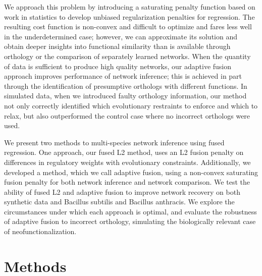 \documentclass[11pt]{article}
\begin{document}
We approach this problem by introducing a saturating penalty function based on work in statistics to develop unbiased regularization penalties for regression. The resulting cost function is non-convex and difficult to optimize and fares less well in the underdetermined case; however, we can approximate its solution and obtain deeper insights into functional similarity than is available through orthology or the comparison of separately learned networks. When the quantity of data is sufficient to produce high quality networks, our adaptive fusion approach improves performance of network inference; this is achieved in part through the identification of presumptive orthologs with different functions. In simulated data, when we introduced faulty orthology information, our method not only correctly identified which evolutionary restraints to enforce and which to relax, but also outperformed the control case where no incorrect orthologs were used. 

We present two methods to multi-species network inference using fused regression. One approach, our fused L2 method, uses an L2 fusion penalty on differences in regulatory weights with evolutionary constraints. Additionally, we developed a method, which we call adaptive fusion, using a non-convex saturating fusion penalty for both network inference and network comparison. We test the ability of fused L2 and adaptive fusion to improve network recovery on both synthetic data and Bacillus subtilis and Bacillus anthracis. We explore the circumstances under which each approach is optimal, and evaluate the robustness of adaptive fusion to incorrect orthology, simulating the biologically relevant case of neofunctionalization. 


\section{Methods}
\end{document}
